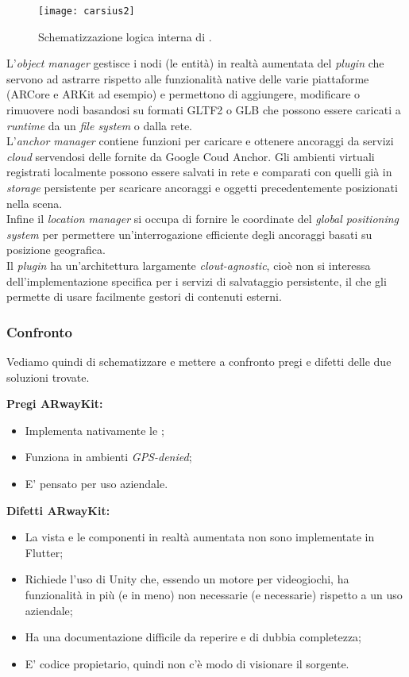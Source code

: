 \begin{figure}[H]
  \centering
  \texttt{[image: carsius2]}
  \caption[Schema \aplug{}]{Schematizzazione logica interna di \aplug{}.\footnotemark}
\end{figure}

L'\textit{object manager} gestisce i nodi (le entità) in realtà aumentata del \textit{plugin} che servono ad astrarre rispetto alle funzionalità native delle varie piattaforme (ARCore e ARKit ad esempio) e permettono di aggiungere, modificare o rimuovere nodi basandosi su formati GLTF2 o GLB che possono essere caricati a \textit{runtime} da un \textit{file system} o dalla rete.\\
L'\textit{anchor manager} contiene funzioni per caricare e ottenere ancoraggi da servizi \textit{cloud} servendosi delle \api{} fornite da Google Coud Anchor. Gli ambienti virtuali registrati localmente possono essere salvati in rete e comparati con quelli già in \textit{storage} persistente per scaricare ancoraggi e oggetti precedentemente posizionati nella scena.\\
Infine il \textit{location manager} si occupa di fornire le coordinate del \textit{global positioning system}  per permettere un'interrogazione efficiente degli ancoraggi basati su posizione geografica.\\
Il \textit{plugin} ha un'architettura largamente \textit{clout-agnostic}, cioè non si interessa dell'implementazione specifica per i servizi di salvataggio persistente, il che gli permette di usare facilmente gestori di contenuti esterni.

\subsubsection{Confronto}
Vediamo quindi di schematizzare e mettere a confronto pregi e difetti delle due soluzioni trovate.\aCapo{}

\textbf{Pregi ARwayKit:}
\begin{itemize}
  \item Implementa nativamente le \asa{};
  \item Funziona in ambienti \textit{GPS-denied};
  \item E' pensato per uso aziendale.
\end{itemize}

\textbf{Difetti ARwayKit:}
\begin{itemize}
  \item La vista e le componenti in realtà aumentata non sono implementate in Flutter;
  \item Richiede l'uso di Unity che, essendo un motore per videogiochi, ha funzionalità in più (e in meno) non necessarie (e necessarie) rispetto a un uso aziendale;
  \item Ha una documentazione difficile da reperire e di dubbia completezza;
  \item E' codice propietario, quindi non c'è modo di visionare il sorgente.
\end{itemize}

